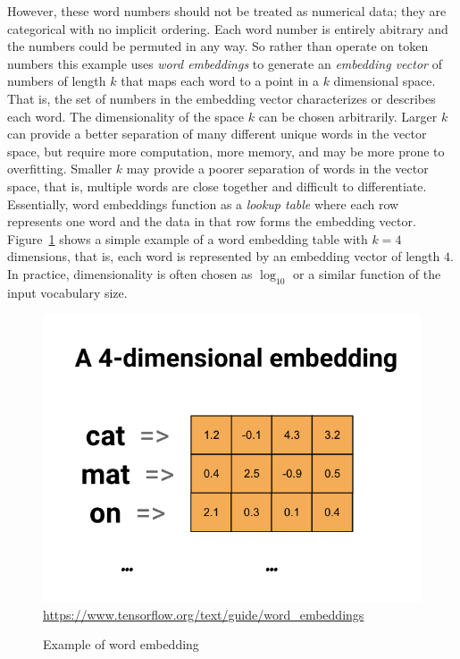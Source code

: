 However, these word numbers should not be treated as numerical data; they are categorical with no implicit ordering. Each word number is entirely abitrary and the numbers could be permuted in any way. So rather than operate on token numbers this example uses \emph{word embeddings} to generate an \emph{embedding vector} of numbers of length $k$ that maps each word to a point in a $k$ dimensional space. That is, the set of numbers in the embedding vector characterizes or describes each word. The dimensionality of the space $k$ can be chosen arbitrarily. Larger $k$ can provide a better separation of many different unique words in the vector space, but require more computation, more memory, and may be more prone to overfitting. Smaller $k$ may provide a poorer separation of words in the vector space, that is, multiple words are close together and difficult to differentiate. Essentially, word embeddings function as a \emph{lookup table} where each row represents one word and the data in that row forms the embedding vector. Figure~\ref{fig:embedding} shows a simple example of a word embedding table with $k=4$ dimensions, that is, each word is represented by an embedding vector of length $4$. In practice, dimensionality is often chosen as $\operatorname{log}_{10}$ or a similar function of the input vocabulary size. 

\begin{figure}
\centering
\includegraphics[width=.5\textwidth]{embedding2.png} \\

\vspace{\baselineskip}
\scriptsize \url{https://www.tensorflow.org/text/guide/word_embeddings}\normalsize
\caption{Example of word embedding}
\label{fig:embedding}
\end{figure}

